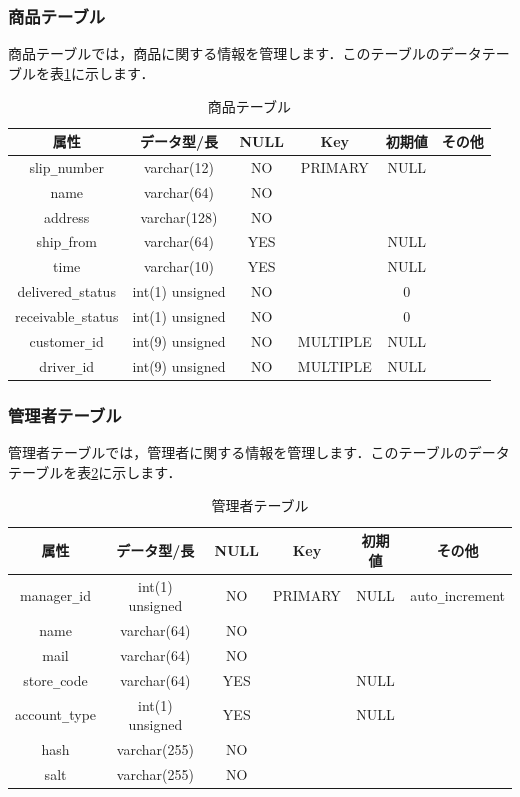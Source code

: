 \documentclass[a4j,titlepage]{jarticle}
\begin{document}
\subsubsection{商品テーブル}
商品テーブルでは，商品に関する情報を管理します．このテーブルのデータテーブルを表\ref{delivery}に示します．
\begin{table}[htb]
  \caption{商品テーブル}
  \label{delivery}
  \begin{center}
    \begin{tabular}{|c|c|c|c|c|c|} \hline
      属性 & データ型/長 & NULL & Key & 初期値 & その他 \\ \hline \hline
      slip\verb|_|number & varchar(12) & NO & PRIMARY & NULL & \\ \hline
      name & varchar(64) & NO &   &  & \\ \hline
      address & varchar(128) & NO &   &  & \\ \hline
      ship\verb|_|from & varchar(64) & YES &  & NULL & \\ \hline
      time & varchar(10) & YES &   & NULL & \\ \hline
      delivered\verb|_|status & int(1) unsigned & NO &   & 0 & \\ \hline
      receivable\verb|_|status & int(1) unsigned & NO &  & 0 & \\ \hline
      customer\verb|_|id & int(9) unsigned & NO & MULTIPLE & NULL & \\ \hline
      driver\verb|_|id & int(9) unsigned & NO & MULTIPLE & NULL & \\ \hline
    \end{tabular}
  \end{center}
\end{table}

\subsubsection{管理者テーブル}
管理者テーブルでは，管理者に関する情報を管理します．このテーブルのデータテーブルを表\ref{manager}に示します．
\begin{table}[htb]
  \caption{管理者テーブル}
  \label{manager}
  \begin{center}
    \begin{tabular}{|c|c|c|c|c|c|} \hline
      属性 & データ型/長 & NULL & Key & 初期値 & その他 \\ \hline \hline
      manager\verb|_|id & int(1) unsigned & NO & PRIMARY & NULL & auto\verb|_|increment\\ \hline
      name & varchar(64) & NO &   &  & \\ \hline
      mail & varchar(64) & NO &  &  & \\ \hline
      store\verb|_|code & varchar(64) & YES &   & NULL & \\ \hline
      account\verb|_|type & int(1) unsigned & YES &   & NULL & \\ \hline
      hash & varchar(255) & NO &   &  & \\ \hline
      salt & varchar(255) & NO &   &  & \\ \hline
    \end{tabular}
  \end{center}
\end{table}
\end{document}
